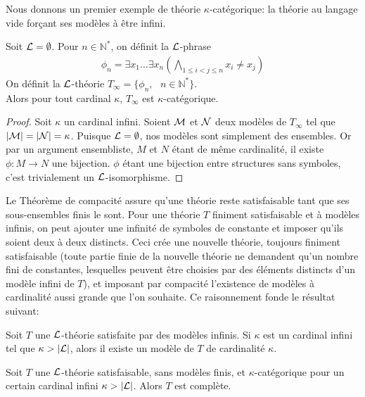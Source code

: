 \noindent Nous donnons un premier exemple de théorie $\kappa$-catégorique: la théorie au langage vide forçant ses modèles à être infini.

\begin{prop}
Soit $\mathcal{L} = \emptyset$. Pour $n \in \mathbb{N^*}$, on définit la $\mathcal{L}$-phrase
\begin{align*}
\phi_n = \exists x_1\dots\exists x_n(\bigwedge_{1\leq i < j \leq n} x_i \neq x_j)
\end{align*}
On définit la $\mathcal{L}$-théorie $T_{\infty} = \{\phi_n,\text{ }n \in \mathbb{N^*}\}$.\\
Alors pour tout cardinal $\kappa$, $T_{\infty}$ est $\kappa$-catégorique.
\end{prop}

\begin{proof}
Soit $\kappa$ un cardinal infini. Soient $\mathcal{M}$ et $\mathcal{N}$ deux modèles de $T_{\infty}$ tel que $\lvert \mathcal{M} \rvert = \lvert \mathcal{N} \rvert = \kappa$.
Puisque $\mathcal{L} = \emptyset$, nos modèles sont simplement des ensembles. Or par un argument ensembliste, $M$ et $N$ étant de même cardinalité, il existe $\phi: M \longrightarrow N$ une bijection.
$\phi$ étant une bijection entre structures sans symboles, c'est trivialement un $\mathcal{L}$-isomorphisme.
\end{proof}

\noindent Le Théorème de compacité assure qu'une théorie reste satisfaisable tant que ses sous-ensembles finis le sont.
Pour une théorie $T$ finiment satisfaisable et à modèles infinis, on peut ajouter une infinité de symboles de constante et imposer qu'ils soient deux à deux distincts.
Ceci crée une nouvelle théorie, toujours finiment satisfaisable (toute partie finie de la nouvelle théorie ne demandent qu'un nombre fini de constantes, lesquelles peuvent 
être choisies par des éléments distincts d'un modèle infini de $T$), et imposant par compacité l'existence de modèles à cardinalité aussi grande que l'on souhaite.
Ce raisonnement fonde le résultat suivant:


\begin{theo}
Soit $T$ une $\mathcal{L}$-théorie satisfaite par des modèles infinis. Si $\kappa$ est un cardinal infini tel que $\kappa > \lvert \mathcal{L} \rvert$, alors
il existe un modèle de $T$ de cardinalité $\kappa$.
\end{theo}

\begin{theo}\label{th-Vaught}
Soit $T$ une $\mathcal{L}$-théorie satisfaisable, sans modèles finis, et $\kappa$-catégorique pour un certain cardinal infini $\kappa > \lvert \mathcal{L} \rvert$.
Alors $T$ est complète.
\end{theo}


